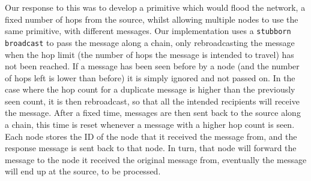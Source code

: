 Our response to this was to develop a primitive which would flood the network, a fixed number of hops from the source, whilst allowing multiple nodes to use the same primitive, with different messages. Our implementation uses a \verb|stubborn broadcast| to pass the message along a chain, only rebroadcasting the message when the hop limit (the number of hops the message is intended to travel) has not been reached. If a message has been seen before by a node (and the number of hops left is lower than before) it is simply ignored and not passed on. In the case where the hop count for a 
duplicate message is higher than the previously seen count, it is then rebroadcast, so that all the intended recipients will receive the message.  
After a fixed time, messages are then sent back to the source along a chain, this time is reset whenever a message with a higher hop count is seen.  Each node stores the ID of the node that it received the message from, and the response message is sent back to that node. In turn, that node will forward the message to the node it received the original message from, eventually the message will end up at the source, to be processed.



